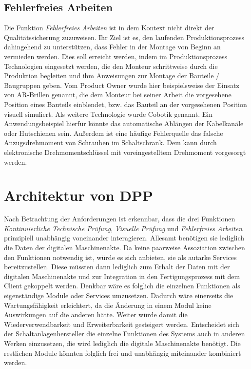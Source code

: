 \documentclass[
    type=Projektarbeit,
    status=draft, %
    language=german, %
    bibengine=bibtex,
]{unibwm-inf-thesis}
\begin{document}
    \subsection{Fehlerfreies Arbeiten}\label{subsec:fehlerfreies-arbeiten}
    Die Funktion \textit{Fehlerfreies Arbeiten} ist in dem Kontext nicht direkt der Qualitätssicherung zuzuweisen.
    Ihr Ziel ist es, den laufenden Produktionsprozess dahingehend zu unterstützen, dass Fehler in der Montage von
    Beginn an vermieden werden.
    Dies soll erreicht werden, indem im Produktionsprozess Technologien eingesetzt werden, die den Monteur schrittweise
    durch die Produktion begleiten und ihm Anweisungen zur Montage der Bauteile / Baugruppen geben.
    Vom Product Owner wurde hier beispielsweise der Einsatz von AR-Brillen genannt, die dem Monteur bei seiner Arbeit
    die vorgesehene Position eines Bauteils einblendet, bzw. das Bauteil an der vorgesehenen Position visuell simuliert.
    Als weitere Technologie wurde Cobotik genannt.
    Ein Anwendungsbeispiel hierfür könnte das automatische Ablängen der Kabelkanäle oder Hutschienen sein.
    Außerdem ist eine häufige Fehlerquelle das falsche Anzugsdrehmoment von Schrauben im Schaltschrank.
    Dem kann durch elektronische Drehmomentschlüssel mit voreingestelltem Drehmoment vorgesorgt werden.


    \section{Architektur von DPP}
    Nach Betrachtung der Anforderungen ist erkennbar, dass die drei Funktionen \textit{Kontinuierliche Technische
    Prüfung}, \textit{Visuelle Prüfung} und \textit{Fehlerfreies Arbeiten} prinzipiell unabhängig voneinander interagieren.
    Allesamt benötigen sie lediglich die Daten der digitalen Maschinenakte.
    Da keine paarweise Assoziation zwischen den Funktionen notwendig ist, würde es sich anbieten, sie als autarke Services
    bereitzustellen.
    Diese müssten dann lediglich zum Erhalt der Daten mit der digitalen Maschinenakte und zur Integration in den
    Fertigungsprozess mit dem Client gekoppelt werden.
    Denkbar wäre es folglich die einzelnen Funktionen als eigenständige Module oder Services umzusetzen.
    Dadurch wäre einerseits die Wartungsfähigkeit erleichtert, da die Änderung in einem Modul keine Auswirkungen auf die anderen hätte.
    Weiter würde damit die Wiederverwendbarkeit und Erweiterbarkeit gesteigert werden.
    Entscheidet sich der Schaltanlagenhersteller die einzelne Funktionen des Systems auch in anderen Werken einzusetzen, die wird lediglich die digitale Maschinenakte benötigt.
    Die restlichen Module könnten folglich frei und unabhängig miteinander kombiniert werden.\\
\end{document}
